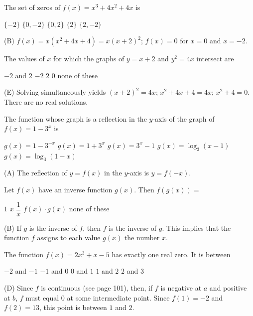 \question
The set of zeros of $f(x)=x^{3}+4 x^{2}+4 x$ is
\begin{choices}
  \choice $\{-2\}$
  \CorrectChoice $\{0,-2\}$
  \choice $\{0,2\}$
  \choice $\{2\}$
  \choice $\{2,-2\}$
\end{choices}
\begin{solution}
(B) $f(x)=x\left(x^{2}+4 x+4\right)=x(x+2)^{2}$; $f(x)=0$ for $x=0$ and $x=-2$.
\end{solution}

\question
The values of $x$ for which the graphs of $y=x+2$ and $y^{2}=4 x$ intersect are
\begin{choices}
  \choice $-2$ and $2$
  \choice $-2$
  \choice $2$
  \choice $0$
  \CorrectChoice none of these
\end{choices}
\begin{solution}
(E) Solving simultaneously yields $(x+2)^{2}=4 x$; $x^{2}+4 x+4=4 x$; $x^{2}+4=0$. There are no real solutions.
\end{solution}




\newpage




\question
The function whose graph is a reflection in the $y$-axis of the graph of $f(x)=1-3^{x}$ is
\begin{choices}
  \CorrectChoice $g(x)=1-3^{-x}$
  \choice $g(x)=1+3^{x}$
  \choice $g(x)=3^{x}-1$
  \choice $g(x)=\log_{3}(x-1)$
  \choice $g(x)=\log_{3}(1-x)$
\end{choices}
\begin{solution}
(A) The reflection of $y=f(x)$ in the $y$-axis is $y=f(-x)$.
\end{solution}

\question
Let $f(x)$ have an inverse function $g(x)$. Then $f(g(x))=$
\begin{choices}
  \choice $1$
  \CorrectChoice $x$
  \choice $\dfrac{1}{x}$
  \choice $f(x) \cdot g(x)$
  \choice none of these
\end{choices}
\begin{solution}
(B) If $g$ is the inverse of $f$, then $f$ is the inverse of $g$. This implies that the function $f$ assigns to each value $g(x)$ the number $x$.
\end{solution}

\question
The function $f(x)=2 x^{3}+x-5$ has exactly one real zero. It is between
\begin{choices}
  \choice $-2$ and $-1$
  \choice $-1$ and $0$
  \choice $0$ and $1$
  \CorrectChoice $1$ and $2$
  \choice $2$ and $3$
\end{choices}
\begin{solution}
(D) Since $f$ is continuous (see page 101), then, if $f$ is negative at $a$ and positive at $b$, $f$ must equal $0$ at some intermediate point. Since $f(1)=-2$ and $f(2)=13$, this point is between $1$ and $2$.
\end{solution}





